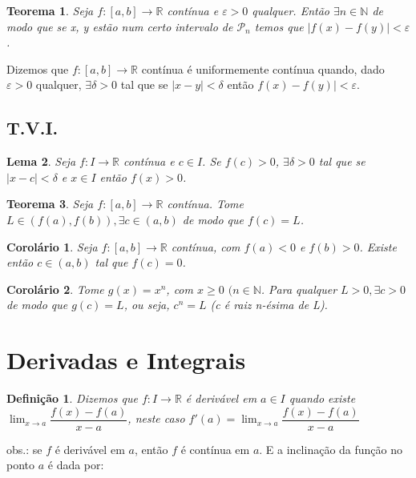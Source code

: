 \documentclass[12pt]{article}
\newtheorem{theorem}{Teorema}[section]
\newtheorem{corollary}{Corolário}[theorem]
\newtheorem{lemma}[theorem]{Lema}
\newtheorem{definition}{Definição}
\begin{document}
\begin{theorem}
  Seja $f: [a, b] \rightarrow{} \mathbb{R}$ contínua e $\varepsilon > 0$ qualquer. Então $\exists n \in \mathbb{N}$ de modo que se x, y estão num certo intervalo de $\mathcal{P}_n$ temos que $|f(x) - f(y)| < \varepsilon$.
\end{theorem}

Dizemos que $f: [a, b] \rightarrow{} \mathbb{R}$ contínua é uniformemente contínua quando, dado $\varepsilon > 0$ qualquer, $\exists \delta > 0$ tal que se $|x-y| < \delta$ então $f(x) - f(y)| < \varepsilon$.

\subsection{T.V.I.}
\begin{lemma} 
    Seja $f: I \rightarrow{} \mathbb{R}$ contínua e $c \in I$. Se $f(c) > 0$, $\exists \delta > 0$ tal que se $|x - c| < \delta$ e $x \in I$ então $f(x) > 0$.
\end{lemma}

\begin{theorem}
    Seja $f: [a, b] \rightarrow{} \mathbb{R}$ contínua. Tome $L \in (f(a), f(b)), \exists c \in (a, b)$ de modo que $f(c) = L$.
\end{theorem}

\begin{corollary}
    Seja $f: [a, b] \rightarrow{} \mathbb{R}$ contínua, com $f(a) < 0$ e $f(b) > 0$. Existe então $c \in (a, b)$ tal que $f(c) = 0$.
\end{corollary}

\begin{corollary}
    Tome $g(x) = x^n$, com $x \geq 0$ $(n \in \mathbb{N}$. Para qualquer $L > 0, \exists c > 0$ de modo que $g(c) = L$, ou seja, $c^n = L$ (c é raiz n-ésima de L).
\end{corollary}

\section{Derivadas e Integrais}

\begin{definition}
    Dizemos que $f: I \rightarrow{} \mathbb{R}$ é derivável em $a \in I$ quando existe $\lim_{x \rightarrow{} a} \dfrac{f(x) - f(a)}{x-a}$, neste caso $f'(a) = \lim_{x \rightarrow{} a} \dfrac{f(x) - f(a)}{x-a}$
\end{definition}

obs.: se $f$ é derivável em $a$, então $f$ é contínua em $a$. E a inclinação da função no ponto $a$ é dada por:
\end{document}
